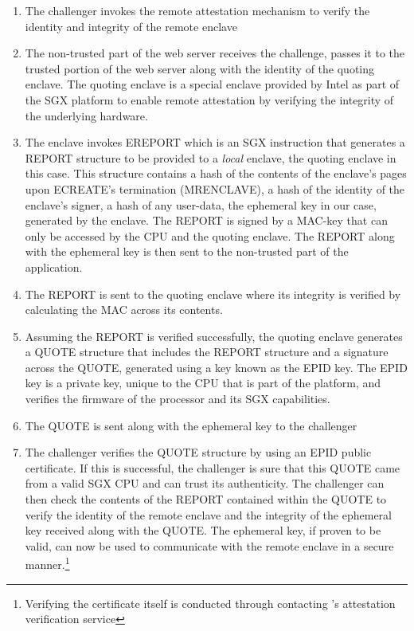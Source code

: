 \documentclass[../main.tex]{subfiles}
\begin{document}
\begin{enumerate}
  \item The challenger invokes the remote attestation mechanism to
    verify the identity and integrity of the remote enclave
  \item The non-trusted part of the web server receives the challenge,
    passes it to the trusted portion of the web server along with
    the identity of the quoting enclave. The quoting enclave is a special
    enclave provided by Intel as part of the SGX platform to enable remote
    attestation by verifying the integrity of the underlying
    hardware. %
  \item The enclave invokes EREPORT which is an SGX instruction that
    generates a REPORT structure to be provided to a \textit{local}
    enclave, the quoting enclave in this case.  This structure contains a
    hash of the contents of the enclave's pages upon ECREATE's termination
    (MRENCLAVE), a hash of the identity of the enclave's signer, a hash of
    any user-data, the ephemeral key in our case, generated by the
    enclave. The REPORT is signed by a MAC-key that can only be accessed
    by the CPU and the quoting enclave. The REPORT along with the
    ephemeral key is then sent to the non-trusted part of the application.
  \item The REPORT is sent to the quoting enclave where its integrity
    is verified by calculating the MAC across its contents.
  \item Assuming the REPORT is verified successfully, the quoting
    enclave generates a QUOTE structure that includes the REPORT structure
    and a signature across the QUOTE, generated using a key known as the
    EPID key. %
    The EPID key is a private key, unique
    to the CPU that is part of the platform, and verifies the firmware of
    the processor and its SGX capabilities.
  \item The QUOTE is sent along with the ephemeral key to the
    challenger
  \item The challenger verifies the QUOTE structure by using an EPID
    public certificate. If this is successful, the challenger is sure
    that this QUOTE came from a valid SGX CPU and can trust its
    authenticity. The challenger can then check the contents of the REPORT
    contained within the QUOTE to verify the identity of the remote
    enclave and the integrity of the ephemeral key received along with
    the QUOTE. The ephemeral key, if proven to be valid, can now be used
    to communicate with the remote enclave in a secure
    manner.\footnote{Verifying the certificate itself is conducted through
    contacting \Intel's attestation verification service}
\end{enumerate}
		
\end{document}
